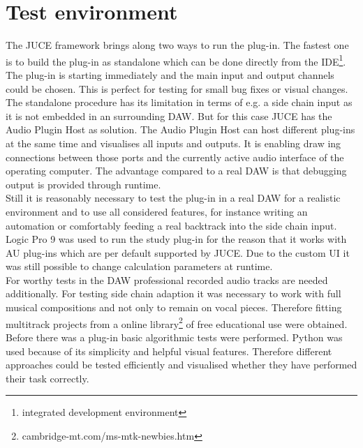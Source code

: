 \section{Test environment}

The JUCE framework brings along two ways to run the plug-in. The fastest one is to build the plug-in as standalone which can be done directly from the IDE\footnote{integrated development environment}. The plug-in is starting immediately and the main input and output channels could be chosen. This is perfect for testing for small bug fixes or visual changes. The standalone procedure has its limitation in terms of e.g. a side chain input as it is not embedded in an surrounding DAW. But for this case JUCE has the Audio Plugin Host as solution. The Audio Plugin Host can host different plug-ins at the same time and visualises all inputs and outputs. It is enabling draw ing connections between those ports and the currently active audio interface of the operating computer. The advantage compared to a real DAW is that debugging output is provided through runtime.\\
Still it is reasonably necessary to test the plug-in in a real DAW for a realistic environment and to use all considered features, for instance writing an automation or comfortably feeding a real backtrack into the side chain input. Logic Pro 9 was used to run the study plug-in for the reason that it works with AU plug-ins which are per default supported by JUCE. Due to the custom UI it was still possible to change calculation parameters at runtime.\\
For worthy tests in the DAW professional recorded audio tracks are needed additionally. For testing side chain adaption it was necessary to work with full musical compositions and not only to remain on vocal pieces. Therefore fitting multitrack projects from a online library\footnote{cambridge-mt.com/ms-mtk-newbies.htm} of free educational use were obtained.\\
Before there was a plug-in basic algorithmic tests were performed. Python was used because of its simplicity and helpful visual features. Therefore different approaches could be tested efficiently and visualised whether they have performed their task correctly.\\
